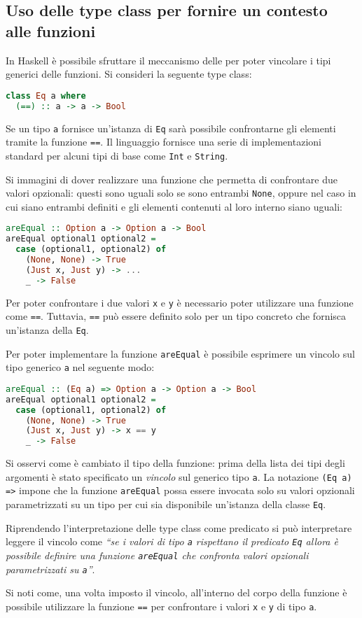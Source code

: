 \subsection{Uso delle type class per fornire un contesto alle funzioni}
In Haskell è possibile sfruttare il meccanismo delle  per poter vincolare i tipi generici delle funzioni.
Si consideri la seguente type class:
\begin{lstlisting}[language=haskell]
class Eq a where
  (==) :: a -> a -> Bool
\end{lstlisting}
Se un tipo \lstinline{a} fornisce un'istanza di \lstinline{Eq} sarà possibile confrontarne gli elementi tramite la funzione \lstinline{==}. Il linguaggio fornisce una serie di implementazioni standard per alcuni tipi di base come \lstinline{Int} e \lstinline{String}.

Si immagini di dover realizzare una funzione che permetta di confrontare due valori opzionali: questi sono uguali solo se sono entrambi \lstinline{None}, oppure nel caso in cui siano entrambi definiti e gli elementi contenuti al loro interno siano uguali:
\begin{lstlisting}[language=haskell]
areEqual :: Option a -> Option a -> Bool
areEqual optional1 optional2 =
  case (optional1, optional2) of
    (None, None) -> True
    (Just x, Just y) -> ...
    _ -> False
\end{lstlisting}
Per poter confrontare i due valori \lstinline{x} e \lstinline{y} è necessario poter utilizzare una funzione come \lstinline{==}. Tuttavia, \lstinline{==} può essere definito solo per un tipo concreto che fornisca un'istanza della  \lstinline{Eq}.

Per poter implementare la funzione \lstinline{areEqual} è possibile esprimere un vincolo sul tipo generico \lstinline{a} nel seguente modo:
\begin{lstlisting}[language=haskell]
areEqual :: (Eq a) => Option a -> Option a -> Bool
areEqual optional1 optional2 =
  case (optional1, optional2) of
    (None, None) -> True
    (Just x, Just y) -> x == y
    _ -> False
\end{lstlisting}
Si osservi come è cambiato il tipo della funzione: prima della lista dei tipi degli argomenti è stato specificato un \emph{vincolo} sul generico tipo \lstinline{a}. La notazione \lstinline{(Eq a) =>} impone che la funzione \lstinline{areEqual} possa essere invocata solo su valori opzionali parametrizzati su un tipo per cui sia disponibile un'istanza della classe \lstinline{Eq}.

Riprendendo l'interpretazione delle type class come predicato si può interpretare leggere il vincolo come \emph{``se i valori di tipo \lstinline{a} rispettano il predicato \lstinline{Eq} allora è possibile definire una funzione \lstinline{areEqual} che confronta valori opzionali parametrizzati su \lstinline{a}''}.

Si noti come, una volta imposto il vincolo, all'interno del corpo della funzione è possibile utilizzare la funzione \lstinline{==} per confrontare i valori \lstinline{x} e \lstinline{y} di tipo \lstinline{a}.

